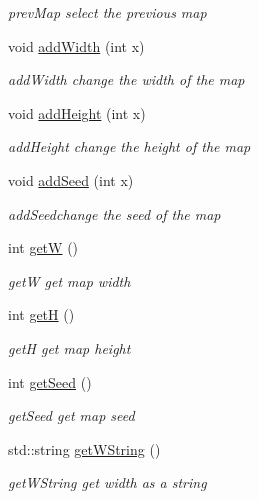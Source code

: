 \begin{DoxyCompactItemize}
\begin{DoxyCompactList}\small\item\em prev\+Map select the previous map \end{DoxyCompactList}\item 
void \hyperlink{class_map_list_a43fe2c28a5e1eda6f2a4182085706be3}{add\+Width} (int x)
\begin{DoxyCompactList}\small\item\em add\+Width change the width of the map \end{DoxyCompactList}\item 
void \hyperlink{class_map_list_a79574bbfe101459d3b83833e8dfb3f9d}{add\+Height} (int x)
\begin{DoxyCompactList}\small\item\em add\+Height change the height of the map \end{DoxyCompactList}\item 
void \hyperlink{class_map_list_aeb099b5e973fbf6d77e64b57becaab6c}{add\+Seed} (int x)
\begin{DoxyCompactList}\small\item\em add\+Seedchange the seed of the map \end{DoxyCompactList}\item 
int \hyperlink{class_map_list_add71973d996b8a93dddbf941cac4d0ca}{get\+W} ()
\begin{DoxyCompactList}\small\item\em get\+W get map width \end{DoxyCompactList}\item 
int \hyperlink{class_map_list_ac7975a92dcf7a2d7a60b0169d04e1446}{get\+H} ()
\begin{DoxyCompactList}\small\item\em get\+H get map height \end{DoxyCompactList}\item 
int \hyperlink{class_map_list_a2b4b3c558304865fec7a31e192ffcbe6}{get\+Seed} ()
\begin{DoxyCompactList}\small\item\em get\+Seed get map seed \end{DoxyCompactList}\item 
std\+::string \hyperlink{class_map_list_adcf922e585005db0cd691b8f4abf048f}{get\+W\+String} ()
\begin{DoxyCompactList}\small\item\em get\+W\+String get width as a string \end{DoxyCompactList}\item 

\end{DoxyCompactItemize}
